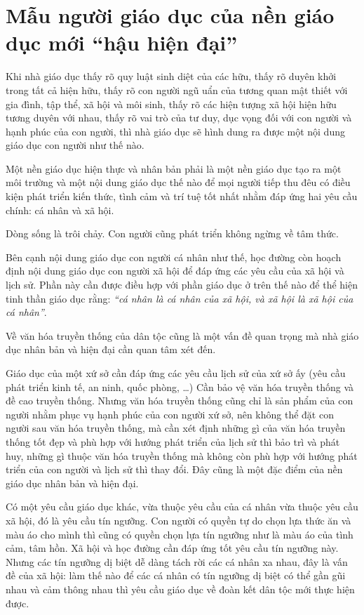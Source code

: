 \chapter{Mẫu người giáo dục của nền giáo dục mới ``hậu hiện đại''} %
\label{cha:mau_nguoi_giao_duc_cua_nen_giao_duc_moi}

Khi nhà giáo dục thấy rõ quy luật sinh diệt của các hữu, thấy rõ duyên khởi trong tất cả hiện hữu, thấy rõ con người ngũ uẩn của tương quan mật thiết với gia đình, tập thể, xã hội và môi sinh, thấy rõ các hiện tượng xã hội hiện hữu tương duyên với nhau, thấy rõ vai trò của tư duy, dục vọng đối với con người và hạnh phúc của con người, thì nhà giáo dục sẽ hình dung ra được một nội dung giáo dục con người như thế nào.

Một nền giáo dục hiện thực và nhân bản phải là một nền giáo dục tạo ra một môi trường và một nội dung giáo dục thế nào để mọi người tiếp thu đêu có điều kiện phát triển kiến thức, tình cảm và trí tuệ tốt nhất nhằm đáp ứng hai yêu cầu chính: cá nhân và xã hội.

Dòng sống là trôi chảy. Con người cũng phát triển không ngừng về tâm thức.

Bên cạnh nội dung giáo dục con người cá nhân như thế, học đường còn hoạch định nội dung giáo dục con người xã hội để đáp ứng các yêu cầu của xã hội và lịch sử. Phần này cần được điều hợp với phần giáo dục ở trên thế nào để thể hiện tinh thần giáo dục rằng: \emph{``cá nhân là cá nhân của xã hội, và xã hội là xã hội của cá nhân''}.

Về văn hóa truyền thống của dân tộc cũng là một vấn đề quan trọng mà nhà giáo dục nhân bản và hiện đại cần quan tâm xét đến.

Giáo dục của một xứ sở cần đáp ứng các yêu cầu lịch sử của xứ sở ấy (yêu cầu phát triển kinh tế, an ninh, quốc phòng, \ldots) Cần bảo vệ văn hóa truyền thống và đề cao truyền thống. Nhưng văn hóa truyền thống cũng chỉ là sản phẩm của con người nhằm phục vụ hạnh phúc của con người xứ sở, nên không thể đặt con người sau văn hóa truyền thống, mà cần xét định những gì của văn hóa truyền thống tốt đẹp và phù hợp với hướng phát triển của lịch sử thì bảo trì và phát huy, những gì thuộc văn hóa truyền thống mà không còn phù hợp với hướng phát triển của con người và lịch sử thì thay đổi. Đây cũng là một đặc điểm của nền giáo dục nhân bản và hiện đại.

Có một yêu cầu giáo dục khác, vừa thuộc yêu cầu của cá nhân vừa thuộc yêu cầu xã hội, đó là yêu cầu tín ngưỡng. Con người có quyền tự do chọn lựa thức ăn và màu áo cho mình thì cũng có quyền chọn lựa tín ngưỡng như là màu áo của tình cảm, tâm hồn. Xã hội và học đường cần đáp ứng tốt yêu cầu tín ngưỡng này. Nhưng các tín ngưỡng dị biệt dễ dàng tách rời các cá nhân xa nhau, đây là vấn đề của xã hội: làm thế nào để các cá nhân có tín ngưỡng dị biệt có thể gần gũi nhau và cảm thông nhau thì yêu cầu giáo dục về đoàn kết dân tộc mới thực hiện được.

